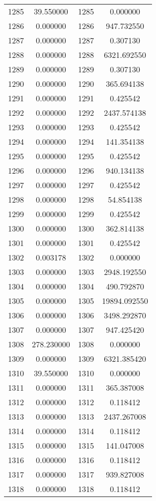 \documentclass[12pt]{article}
\begin{document}
\begin{longtable}{@{}cccc@{}}
1285 & 39.550000 & 1285 & 0.000000 \\
1286 & 0.000000 & 1286 & 947.732550 \\
1287 & 0.000000 & 1287 & 0.307130 \\
1288 & 0.000000 & 1288 & 6321.692550 \\
1289 & 0.000000 & 1289 & 0.307130 \\
1290 & 0.000000 & 1290 & 365.694138 \\
1291 & 0.000000 & 1291 & 0.425542 \\
1292 & 0.000000 & 1292 & 2437.574138 \\
1293 & 0.000000 & 1293 & 0.425542 \\
1294 & 0.000000 & 1294 & 141.354138 \\
1295 & 0.000000 & 1295 & 0.425542 \\
1296 & 0.000000 & 1296 & 940.134138 \\
1297 & 0.000000 & 1297 & 0.425542 \\
1298 & 0.000000 & 1298 & 54.854138 \\
1299 & 0.000000 & 1299 & 0.425542 \\
1300 & 0.000000 & 1300 & 362.814138 \\
1301 & 0.000000 & 1301 & 0.425542 \\
1302 & 0.003178 & 1302 & 0.000000 \\
1303 & 0.000000 & 1303 & 2948.192550 \\
1304 & 0.000000 & 1304 & 490.792870 \\
1305 & 0.000000 & 1305 & 19894.092550 \\
1306 & 0.000000 & 1306 & 3498.292870 \\
1307 & 0.000000 & 1307 & 947.425420 \\
1308 & 278.230000 & 1308 & 0.000000 \\
1309 & 0.000000 & 1309 & 6321.385420 \\
1310 & 39.550000 & 1310 & 0.000000 \\
1311 & 0.000000 & 1311 & 365.387008 \\
1312 & 0.000000 & 1312 & 0.118412 \\
1313 & 0.000000 & 1313 & 2437.267008 \\
1314 & 0.000000 & 1314 & 0.118412 \\
1315 & 0.000000 & 1315 & 141.047008 \\
1316 & 0.000000 & 1316 & 0.118412 \\
1317 & 0.000000 & 1317 & 939.827008 \\
1318 & 0.000000 & 1318 & 0.118412 \\

\end{longtable}
\end{document}
